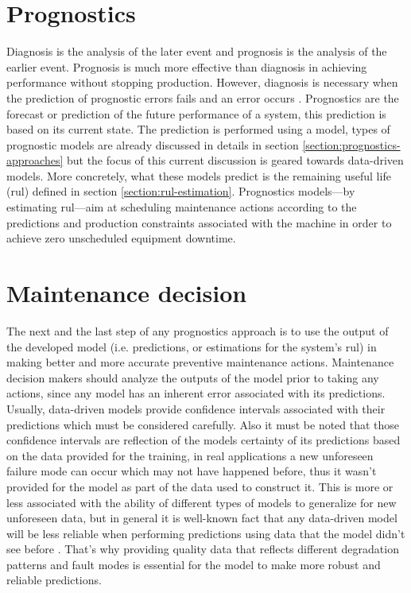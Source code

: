\section{Prognostics}
Diagnosis is the analysis of the later event and prognosis is the analysis of the earlier event. Prognosis is much more effective than diagnosis in achieving performance without stopping production. However, diagnosis is necessary when the prediction of prognostic errors fails and an error occurs \cite{Jardine2006}.
Prognostics are the forecast or prediction of the future performance of a system, this prediction is based on its current state. The prediction is performed using a model, types of prognostic models are already discussed in details in section \ref{section:prognostics-approaches} but the focus of this current discussion is geared towards data-driven models. More concretely, what these models predict is the remaining useful life (\acrshort{rul}) defined in section \ref{section:rul-estimation}. Prognostics models---by estimating \acrshort{rul}---aim at scheduling maintenance actions according to the predictions and production constraints associated with the machine in order to achieve zero unscheduled equipment downtime.

\section{Maintenance decision}
The next and the last step of any prognostics approach is to use the output of the developed model (i.e. predictions, or estimations for the system's \acrshort{rul}) in making better and more accurate preventive maintenance actions. Maintenance decision makers should analyze the outputs of the model prior to taking any actions, since any model has an inherent error associated with its predictions. Usually, data-driven models provide confidence intervals associated with their predictions which must be considered carefully. Also it must be noted that those confidence intervals are reflection of the models certainty of its predictions based on the data provided for the training, in real applications a new unforeseen failure mode can occur which may not have happened before, thus it wasn't provided for the model as part of the data used to construct it. This is more or less associated with the ability of different types of models to generalize for new unforeseen data, but in general it is well-known fact that any data-driven model will be less reliable when performing predictions using data that the model didn't see before \cite{Chung2018}. That's why providing quality data that reflects different degradation patterns and fault modes is essential for the model to make more robust and reliable predictions.

